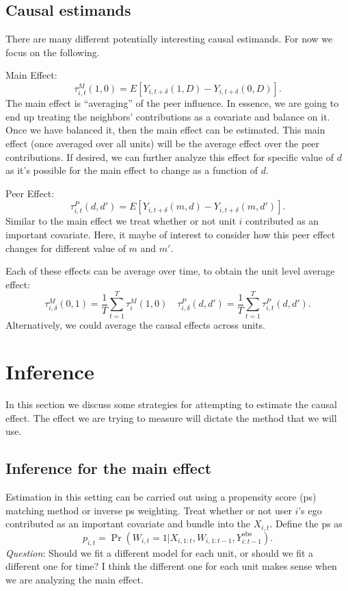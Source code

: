 \documentclass[a4paper]{article}
\begin{document}
\subsection{Causal estimands} %
\label{sub:causal_estimands}
There are many different potentially interesting causal estimands. For now we focus on the following.

Main Effect:
\[
	\tau^M_{i,t}(1,0) = E[Y_{i, t+ \delta} (1,D) - Y_{i, t+ \delta} (0, D)].
\]
The main effect is ``averaging'' of the peer influence. In essence, we are going to end up treating the neighbors' contributions as a covariate and balance on it. Once we have balanced it, then the main effect can be estimated. This main effect (once averaged over all units) will be the average effect over the peer contributions. If desired, we can further analyze this effect for specific value of $d$ as it's possible for the main effect to change as a function of $d$. 

Peer Effect:
\[
	\tau^P_{i,t}(d,d') = E[Y_{i, t+ \delta} (m, d) - Y_{i, t+ \delta} (m, d')].
\]
Similar to the main effect we treat whether or not unit $i$ contributed as an important covariate. Here, it maybe of interest to consider how this peer effect changes for different value of $m$ and $m'$. 

Each of these effects can be average over time, to obtain the unit level average effect:
\[
	\tau^M_{i, \delta}(0,1) = \frac{1}{T} \sum_{t=1}^T \tau^M_i(1,0) \quad \tau^P_{i, \delta}(d,d') =  \frac{1}{T} \sum_{t=1}^T 
	\tau^P_{i,t}(d,d').
\]
Alternatively, we could average the causal effects across units. 

\section{Inference} %
\label{sec:inference}
In this section we discuss some strategies for attempting to estimate the causal effect. The effect we are trying to measure will dictate the method that we will use. 

\subsection{Inference for the main effect}

Estimation in this setting can be carried out using a propensity score (ps) matching method or inverse ps weighting. 
Treat whether or not user $i$'s ego contributed as an important covariate and bundle into the $X_{i,t}$.
Define the ps as
\[
  p_{i,t} = \Pr(W_{i,t} = 1 | X_{i,1:t}, W_{i,1:t-1}, Y_{i:t-1}^\text{obs}).
\]
\emph{Question}: Should we fit a different model for each unit, or should we fit a different one for time? I think the different one for each unit makes sense when we are analyzing the main effect. 
\end{document}
